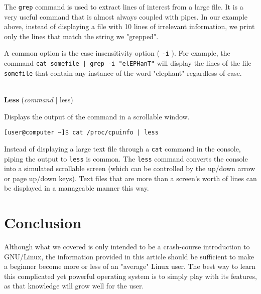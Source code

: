 \documentclass[11pt,oneside]{article}
\newenvironment{articleSectionN}[1]
{#1}
{}
\begin{document}
\begin{articleSectionN}
The \lstinline{grep} command is used to extract lines of interest from a large file. It is a very useful command that is almost always coupled with pipes. In our example above, instead of displaying a file with 10 lines of irrelevant information, we print only the lines that match the string we "grepped".

A common option is the case insensitivity option ( \lstinline{-i} ). For example, the command \lstinline{cat somefile | grep -i "elEPHanT"} will display the lines of the file \lstinline{somefile} that contain any instance of the word "elephant" regardless of case.

\quad \\
\noindent\textbf{Less} (\emph{command} | less)

Displays the output of the command in a scrollable window.

\begin{lstlisting}
[user@computer ~]$ cat /proc/cpuinfo | less
\end{lstlisting}

Instead of displaying a large text file through a \lstinline{cat} command in the console, piping the output to \lstinline{less} is common. The \lstinline{less} command converts the console into a simulated scrollable screen (which can be controlled by the up/down arrow or page up/down keys). Text files that are more than a screen's worth of lines can be displayed in a manageable manner this way.
\end{articleSectionN}


\section*{Conclusion}
\begin{articleSectionN}
Although what we covered is only intended to be a crash-course introduction to GNU/Linux, the information provided in this article should be sufficient to make a beginner become more or less of an "average" Linux user. The best way to learn this complicated yet powerful operating system is to simply play with its features, as that knowledge will grow well for the user.
\end{articleSectionN}
\newpage
\end{document}
